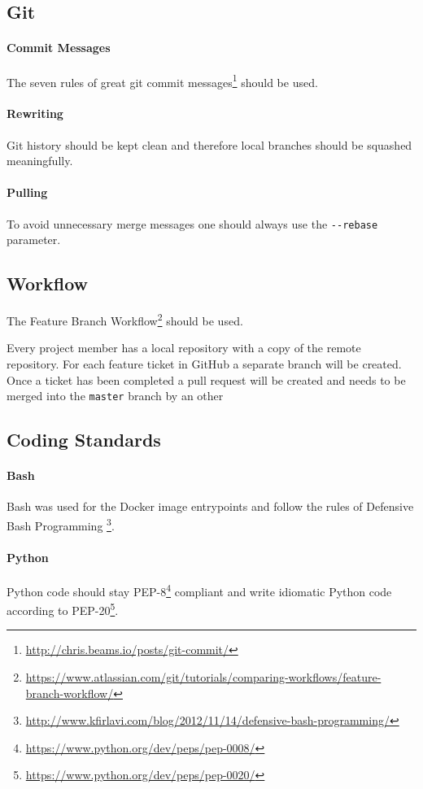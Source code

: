\subsection{Git}\label{git}
\paragraph{Commit Messages}
The seven rules of great git commit
messages\footnote{\url{http://chris.beams.io/posts/git-commit/}} should be used.

\paragraph{Rewriting}
Git history should be kept clean and therefore local branches should be
squashed meaningfully.

\paragraph{Pulling}
To avoid unnecessary merge messages one should always use the
\texttt{-\/-rebase} parameter.

\subsection{Workflow}\label{workflow}
The Feature Branch Workflow\footnote{\url{https://www.atlassian.com/git/tutorials/comparing-workflows/feature-branch-workflow/}} should be used.

Every project member has a local repository with a copy of the remote
repository. For each feature ticket in GitHub a separate branch
will be created. Once a ticket has been completed a pull request will be
created and needs to be merged into the \texttt{master} branch by an other 

\subsection{Coding Standards}

\paragraph{Bash} Bash was used for the Docker image entrypoints and follow
the rules of Defensive Bash Programming \footnote{\url{http://www.kfirlavi.com/blog/2012/11/14/defensive-bash-programming/}}.

\paragraph{Python} Python code should stay PEP-8\footnote{\url{https://www.python.org/dev/peps/pep-0008/}} compliant and write idiomatic Python code according to PEP-20\footnote{\url{https://www.python.org/dev/peps/pep-0020/}}.

